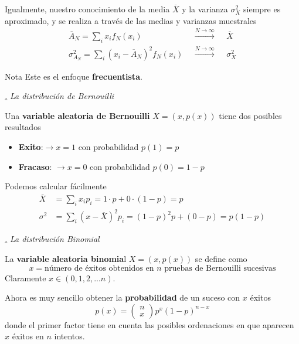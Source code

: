 \documentclass[a4paper,11pt]{book} %
\numberwithin{equation}{chapter}
\def\subsubiContadorIt{\par\addtocounter{subsubsection}{1}\underline{\it\thesubsubsection.}\hskip0.5cm \setcounter{subsubsubsectionIt}{0}}
\newcommand{\SubsubiIt}[1]{
		\subsubiContadorIt \textit{#1}
	}
\newcounter{subsubsubsectionIt}[subsubsection]
\begin{document}
Igualmente, nuestro conocimiento de la  media $\overline X$  y la varianza $\sigma_X^2$ siempre es aproximado, y se realiza a través de las medias y varianzas muestrales
\begin{eqnarray}
\overline{A}_N = \sum_i x_i f_N(x_i)~~~&\stackrel{N\to\infty}{\longrightarrow}&~~~ \overline{X}\\
\sigma_{A_N}^2 = \sum_{i} (x_i - \overline{A}_N)^2 f_N(x_i) ~~~&\stackrel{N\to\infty}{\longrightarrow}&~~~ \sigma_X^2
\end{eqnarray}

\begin{mybox_blue}{Nota}
Este es el enfoque \textbf{frecuentista}.
\end{mybox_blue}


			\SubsubiIt{La distribución de Bernouilli}
\begin{mybox_gray2}{}
Una \textbf{variable aleatoria de Bernouilli} $X=(x,p(x))$ tiene dos posibles resultados
\begin{itemize}
	\item \textbf{Exito}:$\to x=1$ con probabilidad $p(1) = p$

	\item \textbf{Fracaso}: $\to x=0$ con probabilidad $p(0) = 1-p$
\end{itemize}
\end{mybox_gray2}

Podemos calcular fácilmente 
	\begin{equation} 
\begin{aligned}
	\overline X & = \sum_i x_i p_i = 1 \cdot p +0 \cdot (1-p) = p \\
	\sigma^2 & = \sum_i (x-\overline X)^2p_i = (1-p)^2p +(0-p) = p(1-p)
	\end{aligned}
\end{equation}



			\SubsubiIt{La distribución Binomial}

\begin{mybox_gray2}{}
La \textbf{variable aleatoria binomia}l $X = (x,p(x))$ se define como
	\begin{equation}
	x = \text{número de éxitos obtenidos en } n \text{ pruebas de Bernouilli sucesivas}
	\end{equation}
Claramente $x \in (0,1,2,...n)$.

Ahora es muy sencillo obtener la \textbf{probabilidad} de un suceso con $x$ éxitos
	\begin{equation}
	p(x) = \begin{pmatrix}n\\ x\end{pmatrix} p^x (1-p)^{n-x}
	\end{equation}
donde el primer factor tiene en cuenta las posibles ordenaciones en que aparecen $x$ éxitos en $n$ intentos.
\end{mybox_gray2}
\end{document}
